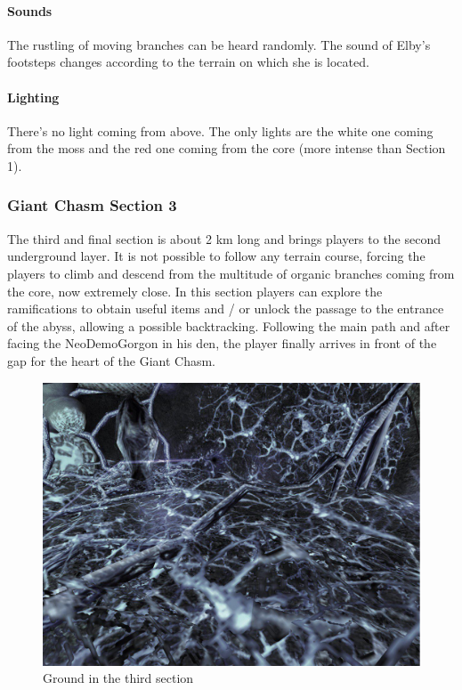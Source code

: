 \paragraph{Sounds}
The rustling of moving branches can be heard randomly. The sound of Elby's footsteps changes according to the terrain on which she is located.

\paragraph{Lighting}
There's no light coming from above. The only lights are the white one coming from the moss and the red one coming from the core (more intense than Section 1).






\newpage
\subsubsection{Giant Chasm Section 3}
The third and final section is about 2 km long and brings players to the second underground layer. It is not possible to follow any terrain course, forcing the players to climb and descend from the multitude of organic branches coming from the core, now extremely close. In this section players can explore the ramifications to obtain useful items and / or unlock the passage to the entrance of the abyss, allowing a possible backtracking. Following the main path and after facing the NeoDemoGorgon in his den, the player finally arrives in front of the gap for the heart of the Giant Chasm.

\vspace*{0.3cm}
\begin{figure}[H]
	\centering
	\includegraphics[width=0.8\linewidth]{images/visual_ref/15_giant_chasm/chasm_section_3.jpg}
	\caption*{Ground in the third section}
\end{figure}


